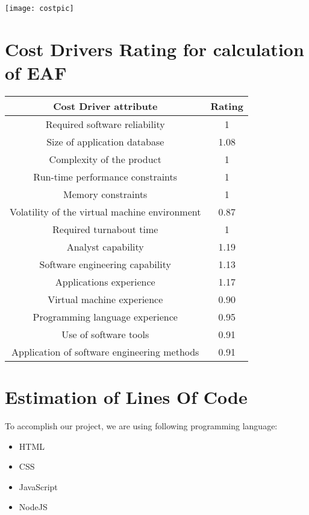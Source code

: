 \documentclass{article}
\begin{document}
 \texttt{[image: costpic]}
 
 \section{Cost Drivers Rating for calculation of EAF}
\begin{tabular}{|c|c|}
\hline \textbf{Cost Driver attribute} & \textbf{Rating}\\
\hline {Required software reliability} & 1\\
\hline Size of application database & 1.08\\
\hline Complexity of the product & 1\\
\hline Run-time performance constraints & 1 \\
\hline Memory constraints & 1\\
\hline Volatility of the virtual machine environment & 0.87\\
\hline Required turnabout time & 1\\
\hline Analyst capability & 1.19\\
\hline Software engineering capability & 1.13\\
\hline Applications experience & 1.17\\
\hline Virtual machine experience  & 0.90\\
\hline Programming language experience & 0.95\\
\hline Use of software tools  & 0.91\\
\hline Application of software engineering methods & 0.91\\
\hline



\end{tabular}

\section{Estimation of Lines Of Code}

To accomplish our project, we are using following programming language:
\begin{itemize}
   
\item HTML
\item CSS

\item JavaScript
\item NodeJS

\end{itemize}
\end{document}
